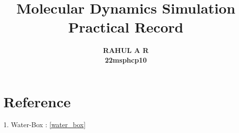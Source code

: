 \documentclass[12pt]{article}
\title{Molecular Dynamics Simulation \\ Practical Record \vspace{10cm}}
\author{\textbf{RAHUL A R}\\ \textbf{22msphcp10}}
\date{}
\begin{document}
\maketitle
\newpage
\tableofcontents
\newpage



\section*{Reference}
1. Water-Box : \ref{water_box}
\end{document}
